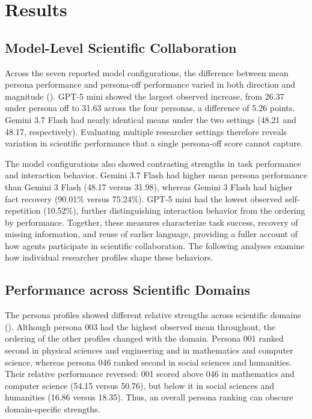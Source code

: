 \section{Results}
\label{sec:results}

\subsection{Model-Level Scientific Collaboration}
\label{sec:model-results}


Across the seven reported model configurations, the difference between
mean persona performance and persona-off performance varied in both
direction and magnitude (). GPT-5 mini showed
the largest observed increase, from 26.37 under persona off to 31.63
across the four personas, a difference of 5.26 points. Gemini 3.7 Flash
had nearly identical means under the two settings (48.21 and 48.17,
respectively). Evaluating multiple researcher settings therefore reveals
variation in scientific performance that a single persona-off score
cannot capture.

The model configurations also showed contrasting strengths in task
performance and interaction behavior. Gemini 3.7 Flash had higher mean
persona performance than Gemini 3 Flash (48.17 versus 31.98), whereas
Gemini 3 Flash had higher fact recovery (90.01\% versus 75.24\%).
GPT-5 mini had the lowest observed self-repetition (10.52\%), further
distinguishing interaction behavior from the ordering by performance.
Together, these measures characterize task success, recovery of missing
information, and reuse of earlier language, providing a fuller account
of how agents participate in scientific collaboration. The following
analyses examine how individual researcher profiles shape these behaviors.

\subsection{Performance across Scientific Domains}
\label{sec:persona-performance}
\begin{table}
\vspace{-\intextsep}

\vspace{-4pt}
\end{table}

The persona profiles showed different relative strengths across scientific
domains (). Although persona 003 had the
highest observed mean throughout, the ordering of the other profiles changed
with the domain. Persona 001 ranked second in physical sciences and
engineering and in mathematics and computer science, whereas persona 046
ranked second in social sciences and humanities. Their relative performance
reversed: 001 scored above 046 in mathematics and computer science
(54.15 versus 50.76), but below it in social sciences and humanities
(16.86 versus 18.35). Thus, an overall persona ranking can obscure
domain-specific strengths.

